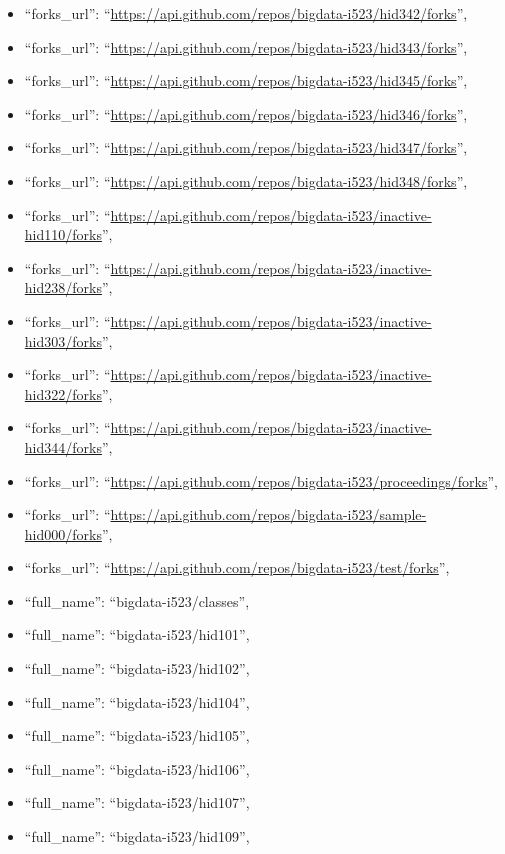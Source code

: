 \begin{itemize}
\item
  ``forks\_url'':
  ``\url{https://api.github.com/repos/bigdata-i523/hid342/forks}'',
\item
  ``forks\_url'':
  ``\url{https://api.github.com/repos/bigdata-i523/hid343/forks}'',
\item
  ``forks\_url'':
  ``\url{https://api.github.com/repos/bigdata-i523/hid345/forks}'',
\item
  ``forks\_url'':
  ``\url{https://api.github.com/repos/bigdata-i523/hid346/forks}'',
\item
  ``forks\_url'':
  ``\url{https://api.github.com/repos/bigdata-i523/hid347/forks}'',
\item
  ``forks\_url'':
  ``\url{https://api.github.com/repos/bigdata-i523/hid348/forks}'',
\item
  ``forks\_url'':
  ``\url{https://api.github.com/repos/bigdata-i523/inactive-hid110/forks}'',
\item
  ``forks\_url'':
  ``\url{https://api.github.com/repos/bigdata-i523/inactive-hid238/forks}'',
\item
  ``forks\_url'':
  ``\url{https://api.github.com/repos/bigdata-i523/inactive-hid303/forks}'',
\item
  ``forks\_url'':
  ``\url{https://api.github.com/repos/bigdata-i523/inactive-hid322/forks}'',
\item
  ``forks\_url'':
  ``\url{https://api.github.com/repos/bigdata-i523/inactive-hid344/forks}'',
\item
  ``forks\_url'':
  ``\url{https://api.github.com/repos/bigdata-i523/proceedings/forks}'',
\item
  ``forks\_url'':
  ``\url{https://api.github.com/repos/bigdata-i523/sample-hid000/forks}'',
\item
  ``forks\_url'':
  ``\url{https://api.github.com/repos/bigdata-i523/test/forks}'',
\item
  ``full\_name'': ``bigdata-i523/classes'',
\item
  ``full\_name'': ``bigdata-i523/hid101'',
\item
  ``full\_name'': ``bigdata-i523/hid102'',
\item
  ``full\_name'': ``bigdata-i523/hid104'',
\item
  ``full\_name'': ``bigdata-i523/hid105'',
\item
  ``full\_name'': ``bigdata-i523/hid106'',
\item
  ``full\_name'': ``bigdata-i523/hid107'',
\item
  ``full\_name'': ``bigdata-i523/hid109'',

\end{itemize}
